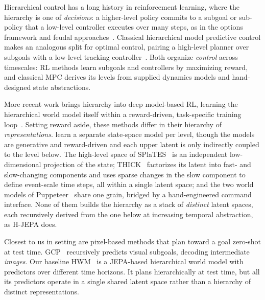 Hierarchical control has a long history in reinforcement learning, where the
hierarchy is one of \emph{decisions}: a higher-level policy commits to a subgoal
or sub-policy that a low-level controller executes over many steps, as in the
options framework and feudal approaches~\citep{sutton1999options,dayan1992feudal,vezhnevets2017feudal,nachum2018hiro}.
Classical hierarchical model predictive control makes an analogous split for
optimal control, pairing a high-level planner over subgoals
with a low-level tracking controller~\citep{fang2019cavin,li2021latentaction,koegel2022safehmpc}.
Both organize \emph{control} across timescales: RL
methods learn subgoals and controllers by maximizing reward, and classical
MPC derives its levels from supplied dynamics models and hand-designed state
abstractions.

More recent work brings hierarchy into deep model-based RL, learning the
hierarchical world model itself within a reward-driven, task-specific training
loop~\citep{hafner2022director,hansen2025puppeteer,gumbsch2024thick,guertler2025splates,schiewer2024limits}.
Setting reward aside, these methods differ in their hierarchy of
\emph{representations}. \citet{schiewer2024limits} learn a separate
state-space model per level, though the models are generative and reward-driven and
each upper latent is only indirectly coupled to the level below.
The high-level space of SPlaTES~\citep{guertler2025splates} is an
independent low-dimensional projection of the state; THICK~\citep{gumbsch2024thick}
factorizes its latent into fast- and slow-changing components and uses sparse
changes in the slow component to define event-scale time steps, all within a
single latent space; and
the two world models of Puppeteer~\citep{hansen2025puppeteer} share one grain, bridged
by a hand-engineered command interface. None of
them builds the hierarchy as a stack of \emph{distinct} latent spaces, each
recursively derived from the one below at increasing temporal abstraction, as
H-JEPA does.

Closest to us in setting are pixel-based methods that plan toward a goal
zero-shot at test
time. GCP~\citep{pertsch2020gcp} recursively predicts visual subgoals, decoding
intermediate \emph{images}. Our baseline
HWM~\citep{zhang2026hierarchical} is a JEPA-based hierarchical world model with
predictors over different time horizons. It plans hierarchically at test time, but
all its predictors operate in a single shared latent space rather than a hierarchy of distinct representations.
